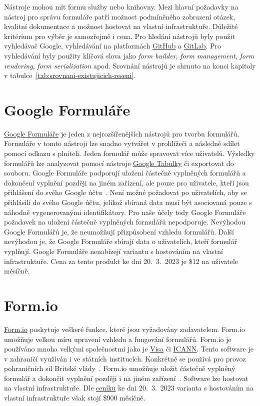 Nástroje mohou mít formu služby nebo knihovny.
Mezi hlavní požadavky na nástroj pro správu formuláře patří možnost podmíněného zobrazení otázek, kvalitní dokumentace a možnost hostovat na vlastní infrastruktuře.
Důležité kritérium pro výběr je samozřejmě i cena.
Pro hledání nástrojů byly použit vyhledávač Google, vyhledávání na platformách \href{https://github.com/}{GitHub} a \href{https://about.gitlab.com/}{GitLab}.
Pro vyhledávání byly použity klíčová slova jako \textit{form builder}, \textit{form management}, \textit{form rendering}, \textit{form serialization} apod.
Srovnání nástrojů je shrnuto na konci kapitoly v tabulce~\ref{tab:srovnani-existujicich-reseni}.

\section*{Google Formuláře}\label{sec:google-formulare}

\href{https://www.google.com/forms/about/}{Google Formuláře} je jeden z nejrozšířenějších nástrojů pro tvorbu formulářů.
Formuláře v tomto nástroji lze snadno vytvářet v prohlížeči a následně sdílet pomocí odkazu s plniteli.
Jeden formulář může spravovat více uživatelů.
Výsledky formulářů lze analyzovat pomocí nástroje \href{https://www.google.com/intl/cs/sheets/about/}{Google Tabulky} či exportovat do souboru.
Google Formuláře podporují uložení částečně vyplněných formulářů a dokončení vyplnění později na jiném zařízení, ale pouze pro uživatele, kteří jsou přihlášení do svého Google účtu~\cite{save-and-return-google-forms}.
Není možné požadovat po uživatelích, aby se přihlásili do svého Google účtu, jelikož sbíraná data musí být asociovaná pouze s náhodně vygenerovanými identifikátory.
Pro naše účely tedy Google Formuláře požadavek na uložení částečně vyplněných formulářů nepodporuje.
Nevýhodou Google Formulářů je, že neumožňují přizpůsobení vzhledu formulářů.
Další nevýhodou je, že Google Formuláře sbírají data o uživatelích, kteří formulář vyplňují.
Google Formuláře nenabízejí variantu s hostováním na vlastní infrastruktuře.
Cena za tento produkt ke dni 20.~3.~2023 je \$12 na uživatele měsíčně.

\section*{Form.io}\label{sec:formio}

\href{https://form.io/}{Form.io} poskytuje veškeré funkce, které jsou vyžadovány zadavatelem.
Form.io umožňuje velkou míru upravení vzhledu a fungování formulářů.
Form.io je používáno mnoha velkými společnostmi jako je \href{https://www.visa.cz/}{Visa} či \href{https://www.icann.org/}{ICANN}\@.
Tento software je v zahraničí využíván i ve státních institucích.
Konkrétně se používá pro provoz pohraničních sil Britské vlády~\cite{formio-use-camundacon}.
Form.io umožňuje uložit částečně vyplněný formulář a dokončit vyplnění později i na jiném zařízení~\cite{save-and-return-formio}.
Software lze hostovat na vlastní infrastruktuře.
Dle \href{https://form.io/pricing}{ceníku} ke dni 20.~3.~2023 varianta s hostováním na vlastní infrastruktuře však stojí \$900 měsíčně.

